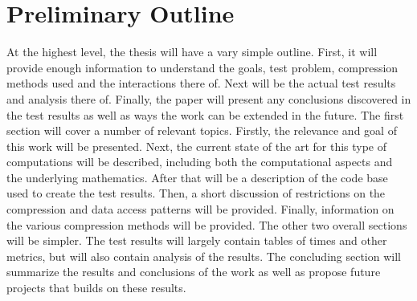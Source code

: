 \documentclass[titlepage]{article}
\begin{document}
\section{Preliminary Outline}

At the highest level, the thesis will have a vary simple outline.
First, it will provide enough information to understand the goals, test problem, compression methods used and the interactions there of.
Next will be the actual test results and analysis there of.
Finally, the paper will present any conclusions discovered in the test results as well as ways the work can be extended in the future.
The first section will cover a number of relevant topics.
Firstly, the relevance and goal of this work will be presented.
Next, the current state of the art for this type of computations will be described,
including both the computational aspects and the underlying mathematics.
After that will be a description of the code base used to create the test results.
Then, a short discussion of restrictions on the compression and data access patterns will be provided.
Finally, information on the various compression methods will be provided.
The other two overall sections will be simpler.
The test results will largely contain tables of times and other metrics, but will also contain analysis of the results.
The concluding section will summarize the results and conclusions of the work as well as propose future projects that builds on these results.


\nocite{*}


\end{document}
